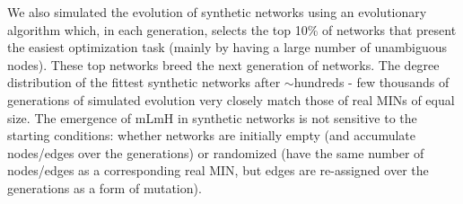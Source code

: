     We also simulated the evolution of synthetic networks using an evolutionary algorithm which, in each generation, selects the top 10\% of networks that present the easiest optimization task (mainly by having a large number of unambiguous nodes). These top networks  breed the next generation of networks. The degree distribution of the fittest synthetic networks after  ${\sim}$hundreds - few thousands of generations  of simulated evolution very closely match those of real MINs of equal size.  The emergence of mLmH in synthetic networks is not sensitive to the starting conditions: whether networks are initially empty (and accumulate nodes/edges over the generations) or randomized (have the same number of nodes/edges as a corresponding real MIN, but edges are re-assigned over the generations as a form of mutation).

    \begin{comment}
        In light of the ongoing debate around the evolutionary advantage of structural properties of MINs and the universal laws that have shaped their evolution,  the presented results indicate the mLmH property minimizes the computational costs (the number of RVnRS) of rewiring the interaction network in response to  an evolutionary pressure to change. The presented model provides sufficient conditions for predicting and evolving mLmH-possessing synthetic networks whose degree distribution closely match real MINs of equal size. The model provides a necessary condition in that deviation from the mLmH topology necessarily (assuming \myC{P}$\neq$\myC{NP}) leads to an exponential increase in the search space that RVnRS must explore before the network has sufficiently been transformed away from a deleterious and into an advantageous state.
    \end{comment}
